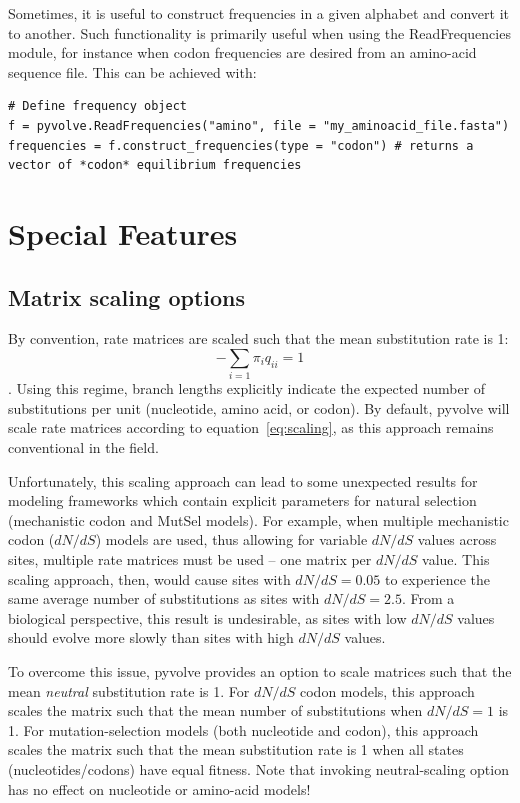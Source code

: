 \documentclass{article}
\begin{document}
Sometimes, it is useful to construct frequencies in a given alphabet and convert it to another. Such functionality is primarily useful when using the ReadFrequencies module, for instance when codon frequencies are desired from an amino-acid sequence file. This can be achieved with:
\begin{lstlisting}
# Define frequency object
f = pyvolve.ReadFrequencies("amino", file = "my_aminoacid_file.fasta")
frequencies = f.construct_frequencies(type = "codon") # returns a vector of *codon* equilibrium frequencies
\end{lstlisting}


\section{Special Features}\label{sec:special}

\subsection{Matrix scaling options}\label{sec:scaling}

By convention, rate matrices are scaled such that the mean substitution rate is 1:
\begin{equation}\label{eq:scaling}
- \sum_{i=1} \pi_iq_{ii} = 1
\end{equation}
 \citep{GY94,Yang1994}. Using this regime, branch lengths explicitly indicate the expected number of substitutions per unit (nucleotide, amino acid, or codon). By default, pyvolve will scale rate matrices according to equation~\ref{eq:scaling}, as this approach remains conventional in the field. 
 
Unfortunately, this scaling approach can lead to some unexpected results for modeling frameworks which contain explicit parameters for natural selection (mechanistic codon and MutSel models). For example, when multiple mechanistic codon ($dN/dS$) models are used, thus allowing for variable $dN/dS$ values across sites, multiple rate matrices must be used -- one matrix per $dN/dS$ value. This scaling approach, then, would cause sites with $dN/dS = 0.05$ to experience the same average number of substitutions as sites with $dN/dS = 2.5$. From a biological perspective, this result is undesirable, as sites with low $dN/dS$ values should evolve more slowly than sites with high $dN/dS$ values.
 
To overcome this issue, pyvolve provides an option to scale matrices such that the mean \textit{neutral} substitution rate is 1. For $dN/dS$ codon models, this approach scales the matrix such that the mean number of substitutions when $dN/dS = 1$ is 1. For mutation-selection models (both nucleotide and codon), this approach scales the matrix such that the mean substitution rate is 1 when all states (nucleotides/codons) have equal fitness. Note that invoking neutral-scaling option has no effect on nucleotide or amino-acid models!
\end{document}
